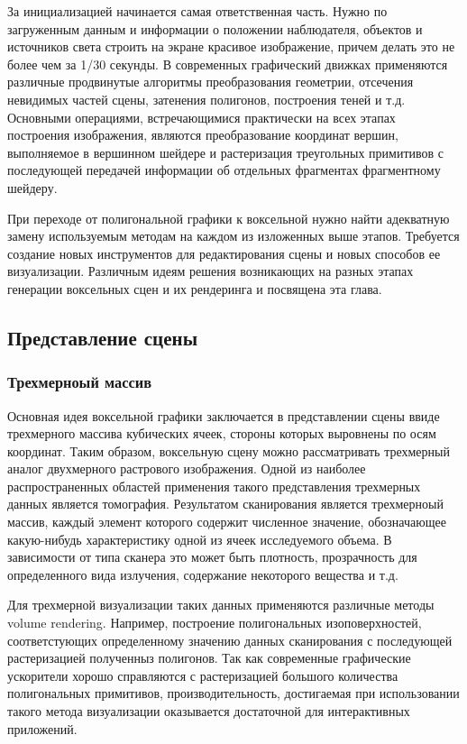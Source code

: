 \documentclass[a4paper,12pt,oneside]{article}
\begin{document}
За инициализацией начинается самая ответственная часть. Нужно по загруженным данным и информации о положении наблюдателя, объектов и источников света строить на экране красивое изображение, причем делать это не более чем за 1/30 секунды. В современных графический движках применяются различные продвинутые алгоритмы преобразования геометрии, отсечения невидимых частей сцены, затенения полигонов, построения теней и т.д. Основными операциями, встречающимися практически на всех этапах построения изображения, являются преобразование координат вершин, выполняемое в вершинном шейдере и растеризация треугольных примитивов с последующей передачей информации об отдельных фрагментах фрагментному шейдеру.

При переходе от полигональной графики к воксельной нужно найти адекватную замену используемым методам на каждом из изложенных выше этапов. Требуется создание новых инструментов для редактирования сцены и новых способов ее визуализации. Различным идеям решения возникающих на разных этапах генерации воксельных сцен и их рендеринга и посвящена эта глава.

\subsection{Представление сцены}

\subsubsection{Трехмерноый массив}
Основная идея воксельной графики заключается в представлении сцены ввиде трехмерного массива кубических ячеек, стороны которых выровнены по осям координат. Таким образом, воксельную сцену можно рассматривать трехмерный аналог двухмерного растрового изображения. Одной из наиболее распространенных областей применения такого представления трехмерных данных является томография. Результатом сканирования является трехмерноый массив, каждый элемент которого содержит численное значение, обозначающее какую-нибудь характеристику одной из ячеек исследуемого объема. В зависимости от типа сканера это может быть плотность, прозрачность для определенного вида излучения, содержание некоторого вещества и т.д. 

Для трехмерной визуализации таких данных применяются различные методы volume rendering. Например, построение полигональных изоповерхностей, соответстующих определенному значению данных сканирования с последующей растеризацией полученныз полигонов. Так как современные графические ускорители хорошо справляются с растеризацией большого количества полигональных примитивов, производительность, достигаемая при использовании такого метода визуализации оказывается достаточной для интерактивных приложений. 
\end{document}

